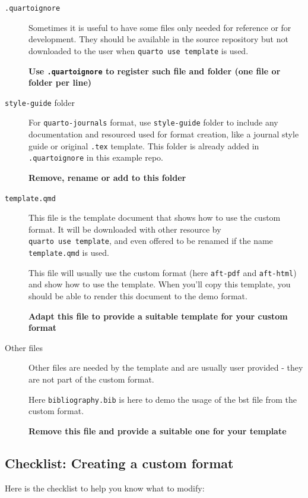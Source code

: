 \documentclass[fleqn,10pt]{wlscirep}
\begin{document}
\begin{description}
\item[\texttt{.quartoignore}]
Sometimes it is useful to have some files only needed for reference or
for development. They should be available in the source repository but
not downloaded to the user when \texttt{quarto\ use\ template} is used.

\textbf{Use \texttt{.quartoignore} to register such file and folder (one
file or folder per line)}
\item[\texttt{style-guide} folder]
For \texttt{quarto-journals} format, use \texttt{style-guide} folder to
include any documentation and resourced used for format creation, like a
journal style guide or original \texttt{.tex} template. This folder is
already added in \texttt{.quartoignore} in this example repo.

\textbf{Remove, rename or add to this folder}
\item[\texttt{template.qmd}]
This file is the template document that shows how to use the custom
format. It will be downloaded with other resource by
\texttt{quarto\ use\ template}, and even offered to be renamed if the
name \texttt{template.qmd} is used.

This file will usually use the custom format (here \texttt{aft-pdf} and
\texttt{aft-html}) and show how to use the template. When you'll copy
this template, you should be able to render this document to the demo
format.

\textbf{Adapt this file to provide a suitable template for your custom
format}
\item[Other files]
Other files are needed by the template and are usually user provided -
they are not part of the custom format.

Here \texttt{bibliography.bib} is here to demo the usage of the bst file
from the custom format.

\textbf{Remove this file and provide a suitable one for your template}
\end{description}

\newpage{}

\hypertarget{checklist-creating-a-custom-format}{%
\subsection{Checklist: Creating a custom
format}\label{checklist-creating-a-custom-format}}

Here is the checklist to help you know what to modify:
\end{document}

